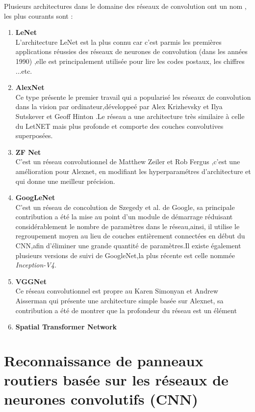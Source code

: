 Plusieurs architectures dans le domaine des réseaux de convolution ont un nom , les plus courants sont :
\begin{enumerate}
    \item {\textbf{LeNet}}\\
    L'architecture LeNet est la plus connu car c'est parmis les premières applications réussies des réseaux de neurones de convolution (dans les années 1990) \cite{64},elle est principalement utilisée pour lire les codes postaux, les chiffres ...etc.
    \item {\textbf{AlexNet}}\\
    Ce type présente le premier travail qui a popularisé les réseaux de convolution dans la vision par ordinateur,développeé par Alex Krizhevsky et Ilya Sutskever et Geoff Hinton \cite{61}.Le réseau a une architecture très similaire à celle du LetNET mais plus profonde et comporte des couches convolutives superposées.\\
    \item {\textbf{ZF Net}}\\
    C'est un réseau convolutionnel de Matthew Zeiler et Rob Fergus \cite{62},c'est une amélioration pour Alexnet, en modifiant les hyperparamétres d'architecture et qui donne une meilleur précision.\\
    
    \item {\textbf{GoogLeNet}}\\
      C'est un réseau de concolution de Szegedy et al. \cite{63} de Google, sa principale contribution a été la mise au point d'un module de démarrage réduisant considérablement le nombre de paramètres dans le réseau,ainsi, il utilise le regroupement moyen au lieu de couches entièrement connectées en début du CNN,afin d'éliminer une grande quantité de paramètres.Il existe également plusieurs versions de suivi de GoogleNet,la plus récente est celle nommée \textit{Inception-V4}.   
    \item {\textbf{VGGNet}}\\
    Ce réseau convolutionnel est propre au Karen Simonyan et Andrew Aisserman \cite{65} qui présente une architecture simple basée sur Alexnet, sa contribution a été de montrer que la profondeur du réseau est un élément 
    \item {\textbf{Spatial Transformer Network}}\\
\end{enumerate}

\section{Reconnaissance de panneaux routiers basée sur les réseaux de neurones convolutifs (CNN) }

